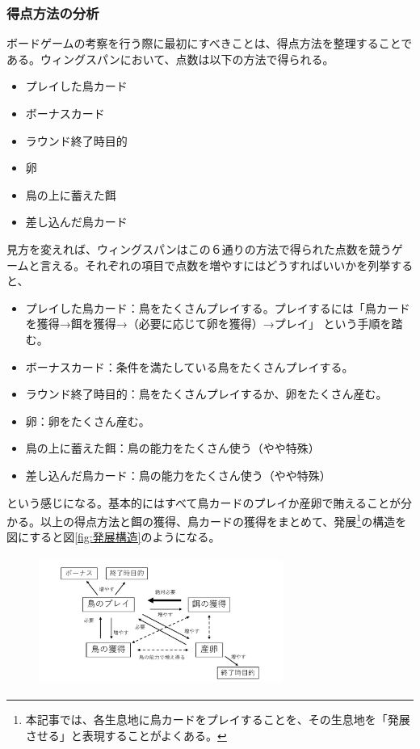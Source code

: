 \begin{multicols}{2}
\subsubsection{得点方法の分析}
ボードゲームの考察を行う際に最初にすべきことは、得点方法を整理することである。ウィングスパンにおいて、点数は以下の方法で得られる。
\begin{itemize}
  \item プレイした鳥カード
  \item ボーナスカード
  \item ラウンド終了時目的
  \item 卵
  \item 鳥の上に蓄えた餌
  \item 差し込んだ鳥カード
\end{itemize}
見方を変えれば、ウィングスパンはこの６通りの方法で得られた点数を競うゲームと言える。それぞれの項目で点数を増やすにはどうすればいいかを列挙すると、
\begin{itemize}
  \item プレイした鳥カード：鳥をたくさんプレイする。プレイするには「鳥カードを獲得→餌を獲得→（必要に応じて卵を獲得）→プレイ」
  という手順を踏む。
  \item ボーナスカード：条件を満たしている鳥をたくさんプレイする。
  \item ラウンド終了時目的：鳥をたくさんプレイするか、卵をたくさん産む。
  \item 卵：卵をたくさん産む。
  \item 鳥の上に蓄えた餌：鳥の能力をたくさん使う（やや特殊）
  \item 差し込んだ鳥カード：鳥の能力をたくさん使う（やや特殊）
\end{itemize}
という感じになる。基本的にはすべて鳥カードのプレイか産卵で賄えることが分かる。以上の得点方法と餌の獲得、鳥カードの獲得をまとめて、発展\footnote{本記事では、各生息地に鳥カードをプレイすることを、その生息地を「発展させる」と表現することがよくある。}の構造を図にすると図\ref{fig:発展構造}のようになる。
\begin{figure}[htbp]
\begin{minipage}[b]{.5\textwidth}
  \centering
  \includegraphics[height=4.2cm,width=8cm]{2025shinki/wing_span/WS_hattenkouzou.pdf}

\end{minipage}
\end{figure}
\end{multicols}
